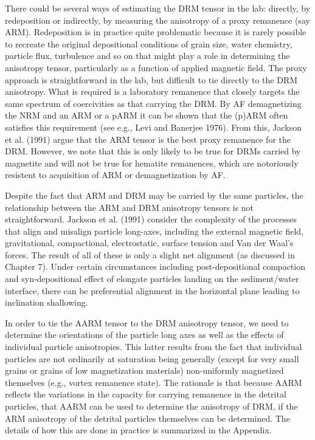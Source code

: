 There could be  several ways of estimating the DRM tensor in the lab:  directly,  by redeposition or indirectly,  by measuring the anisotropy of a proxy remanence (say ARM).  Redeposition is in practice quite problematic because it is rarely possible to recreate the original depositional conditions of grain size, water chemistry, particle flux, turbulence and so on that might play a role in  determining the anisotropy tensor, particularly as a function of applied magnetic field.  The proxy approach is straightforward in the lab, but difficult to tie directly to the DRM anisotropy.    What is required is a laboratory remanence that closely targets the same spectrum of coercivities as that carrying the DRM.   By AF demagnetizing the NRM and an ARM or a  pARM     it can be shown that the (p)ARM often satisfies this requirement (see e.g., 
Levi and Banerjee 1976). \nocite{levi76} 
From this, 
 Jackson et al. (1991) argue that the ARM tensor is the best proxy remanence for the DRM.    However, we note that this is only likely to be true for DRMs carried by magnetite and will not be true for hematite remanences, which are notoriously resistent to acquisition of ARM or demagnetization by AF.  

Despite the fact that ARM and DRM may be carried by the same particles, the  relationship between the ARM and DRM anisotropy tensors is not straightforward.   
Jackson et al. (1991) consider the complexity of the processes that align and misalign particle long-axes, including the external magnetic field, gravitational, compactional, electrostatic, surface tension and Van der Waal's forces.   The result of all of these is only a slight net alignment (as discussed in Chapter 7).  Under certain circumstances including post-depositional compaction and syn-depositional effect of elongate particles landing on the sediment/water interface,  there can be preferential alignment in the horizontal plane leading to inclination shallowing.  

In order to tie the AARM tensor to the DRM anisotropy tensor,  we need to determine the orientations of the particle long axes  as well as the effects of  individual particle  anisotropies.   This latter results from the fact that individual particles are
not ordinarily at saturation being  generally (except for very small grains or grains of low magnetization materials) non-uniformly magnetized themselves (e.g., vortex remanence state).     The  rationale is  that because AARM reflects the variations in the capacity for carrying remanence in the detrital particles, that AARM can be used to determine the anisotropy of DRM, if the ARM anisotropy of the detrital particles themselves  can be determined.    The details of how this are done in practice is summarized in the Appendix.  

